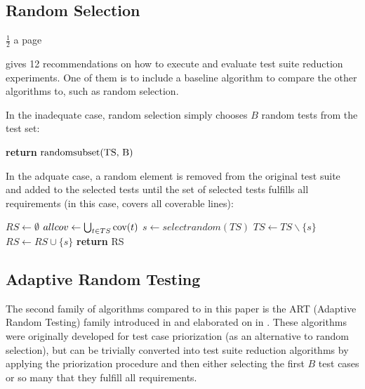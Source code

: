 \subsection{Random Selection}

$\frac{1}{2}$ a page

\cite{khan2018systematic} gives 12 recommendations on how to execute and
evaluate test suite reduction experiments. One of them is to include a
baseline algorithm to compare the other algorithms to, such as random
selection.

In the inadequate case, random selection simply chooses $B$ random tests
from the test set:

\begin{algorithm}
\begin{algorithmic}
	\State \textbf{return} $\hbox{randomsubset(TS, B)}$
\EndFunction
\end{algorithmic}
\end{algorithm}

In the adquate case, a random element is removed from the original test
suite and added to the selected tests until the set of selected tests
fulfills all requirements (in this case, covers all coverable lines):

\begin{algorithm}
\begin{algorithmic}
	\State $RS \gets \emptyset$
	\State $allcov \gets \bigcup_{t \in TS} \hbox{cov}(t)$
		\State $s \gets selectrandom(TS)$
		\State $TS \gets TS \backslash \{s\}$
		\State $RS \gets RS \cup \{s\}$
	\EndWhile
	\State \textbf{return} RS
\EndFunction
\end{algorithmic}
\end{algorithm}

\subsection{Adaptive Random Testing}

The second family of algorithms compared to in this paper is the ART
(Adaptive Random Testing) family introduced in \cite{jiang2009adaptive}
and elaborated on in \cite{chen2010adaptive}. These algorithms were
originally developed for test case priorization (as an alternative
to random selection), but can be trivially converted into test suite
reduction algorithms by applying the priorization procedure and then
either selecting the first $B$ test cases or so many that they fulfill
all requirements.

